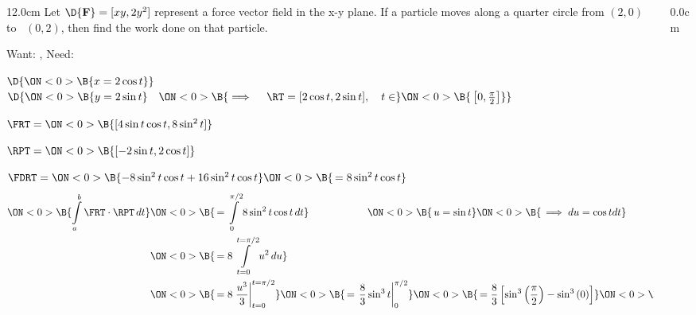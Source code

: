\begin{frame}
\frametitle{}
\scriptsize
\begin{columns}\begin{column}{12.0cm}
\EX Let $\D{\bf F} = [xy,2y^2]$ represent a force vector field in the x-y plane.  If a particle moves along a quarter circle from $(2,0)$ \, to \, $(0,2)$, then find the work done on that particle.

Want: 
, \quad Need: 

\vspace{0.2cm}


\vspace{0.2cm}

$\D{
\ON<0>{\B{x = 2\cos t}}}$\\
$\D{
\ON<0>{\B{y = 2\sin t}} \quad 
\ON<0>{\B{\implies \quad \RT = [2\cos t, 2\sin t], \quad t \in }}
\ON<0>{\B{\, \left[0, \frac{\pi}{2}\right]}} } $\\

\vspace{0.2cm}

$\FRT = 
\ON<0>{\B{[4\sin t\cos t,8\sin^2 t]}}$
	
\vspace{0.2cm}
	
$\RPT = 
\ON<0>{\B{[-2\sin t, 2\cos t]}}$
	
\vspace{0.2cm}
	
$\FDRT = 
\ON<0>{\B{-8\sin^2 t\cos t + 16\sin^2 t\cos t}} 
\ON<0>{\B{\, = 8\sin^2 t\cos t}}$
\begin{align*}
	\ON<0>{\B{\int \limits_{a}^{b} \FRT \cdot \RPT \, dt}}  
		& \ON<0>{\B{\, = \int \limits_{0}^{\pi/2} 8\sin^2 t\cos t \, dt}} \hspace{2.0cm}
		\ON<0>{\B{\, u=\sin t}} 
		\ON<0>{\B{\, \implies du=\cos t dt}} \\
		& \ON<0>{\B{\, = 8\int \limits_{t=0}^{t=\pi/2} u^2 \, du}}\\
		& \ON<0>{\B{\, = 8\left.\frac{u^3}{3}\right|_{t=0}^{t=\pi/2}}}
		  \ON<0>{\B{\, = \left.\frac{8}{3}\sin^3t\right|_{0}^{\pi/2}}}
		  \ON<0>{\B{\, = \frac{8}{3}\left[\sin^3\left(\frac{\pi}{2}\right) - \sin^3\left(0\right)\right]}}
		  \ON<0>{\B{\, = \frac{8}{3}}}  \\
\end{align*}

\vspace{9.6cm}

\end{column}\begin{column}{0.0cm}\end{column}\end{columns}
\end{frame}

